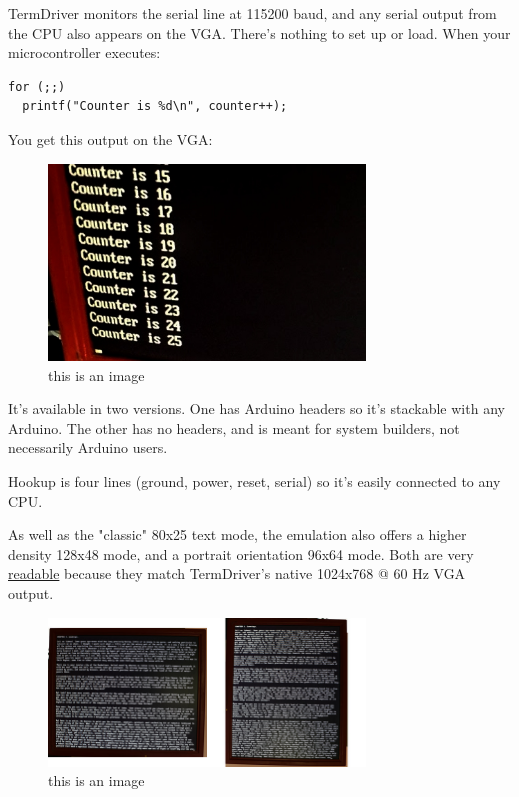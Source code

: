 \documentclass{article}
\begin{document}
TermDriver monitors the serial line at 115200 baud, and any serial
output from the CPU also appears on the VGA. There's nothing to set up
or load. When your microcontroller executes:

\begin{verbatim}
for (;;)
  printf("Counter is %d\n", counter++);
\end{verbatim}

You get this output on the VGA:

\begin{figure}[H]
  \centering
  \caption{this is an image}
  \includegraphics[width=0.75\textwidth]{img/img3}
\end{figure}

It's available in two versions. One has Arduino headers so it's
stackable with any Arduino. The other has no headers, and is meant for
system builders, not necessarily Arduino users.

Hookup is four lines (ground, power, reset, serial) so it's easily
connected to any CPU.

As well as the "classic" 80x25 text mode, the emulation also offers a
higher density 128x48 mode, and a portrait orientation 96x64 mode. Both
are very \href{http://excamera.com/files/DSC_8931.jpg}{readable} because
they match TermDriver's native 1024x768 @ 60 Hz VGA output.

\begin{figure}[H]
  \centering
  \caption{this is an image}
  \includegraphics[width=0.75\textwidth]{img/img4}
\end{figure}
\end{document}
